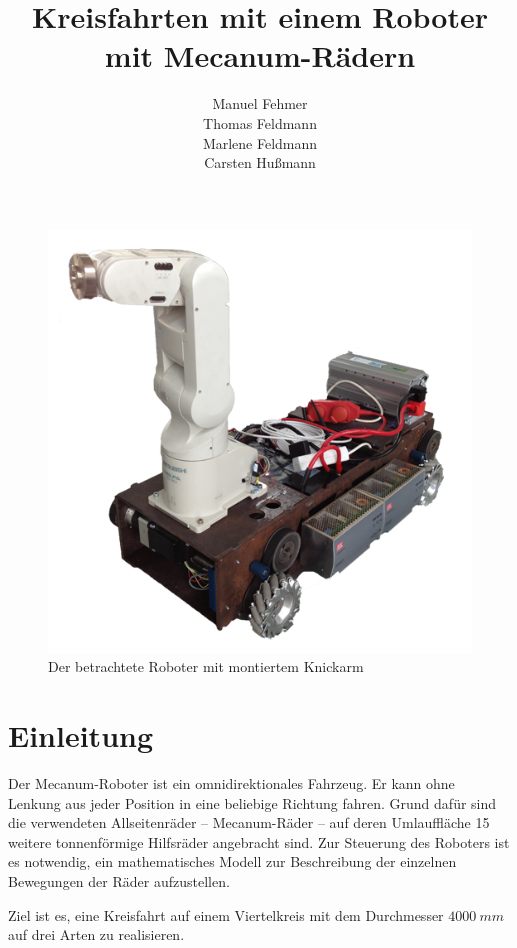 \documentclass[a4paper]{article}
\title{Kreisfahrten mit einem Roboter mit Mecanum-Rädern}
\author{Manuel Fehmer \\ Thomas Feldmann \\ Marlene Feldmann \\ Carsten Hußmann}
\begin{document}
\maketitle
\begin{figure}
    \centering
    \includegraphics[width=.9\textwidth]{Abbildungen/Roboter}
    \caption{Der betrachtete Roboter mit montiertem Knickarm}
\end{figure}
\newpage

\section{Einleitung}
Der Mecanum-Roboter ist ein omnidirektionales Fahrzeug. Er kann ohne Lenkung aus jeder Position in eine beliebige Richtung fahren. Grund dafür sind die verwendeten Allseitenräder -- Mecanum-Räder -- auf deren Umlauffläche 15 weitere tonnenförmige Hilfsräder angebracht sind. Zur Steuerung des Roboters ist es notwendig, ein mathematisches Modell zur Beschreibung der einzelnen Bewegungen der Räder aufzustellen.

Ziel ist es, eine Kreisfahrt auf einem Viertelkreis mit dem Durchmesser $4000~mm$ auf drei Arten zu realisieren.
\end{document}
